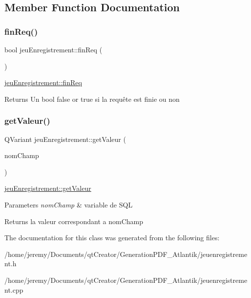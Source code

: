 \subsection{Member Function Documentation}
\mbox{\label{classjeu_enregistrement_ad4689ab49e4a51fde86e3b00e15e473e}} 
\subsubsection{\texorpdfstring{fin\+Req()}{finReq()}}
{\footnotesize\ttfamily bool jeu\+Enregistrement\+::fin\+Req (\begin{DoxyParamCaption}{ }\end{DoxyParamCaption})}



\hyperlink{classjeu_enregistrement_ad4689ab49e4a51fde86e3b00e15e473e}{jeu\+Enregistrement\+::fin\+Req} 

\begin{DoxyReturn}{Returns}
Un bool false or true si la requête est finie ou non 
\end{DoxyReturn}
\mbox{\label{classjeu_enregistrement_acd8e0e1bc08d6b1a5c5966d565e134a2}} 
\subsubsection{\texorpdfstring{get\+Valeur()}{getValeur()}}
{\footnotesize\ttfamily Q\+Variant jeu\+Enregistrement\+::get\+Valeur (\begin{DoxyParamCaption}\item[{Q\+String}]{nom\+Champ }\end{DoxyParamCaption})}



\hyperlink{classjeu_enregistrement_acd8e0e1bc08d6b1a5c5966d565e134a2}{jeu\+Enregistrement\+::get\+Valeur} 


\begin{DoxyParams}{Parameters}
{\em nom\+Champ} & variable de S\+QL \\
\hline
\end{DoxyParams}
\begin{DoxyReturn}{Returns}
la valeur correspondant a nom\+Champ 
\end{DoxyReturn}


The documentation for this class was generated from the following files\+:\begin{DoxyCompactItemize}
\item 
/home/jeremy/\+Documents/qt\+Creator/\+Generation\+P\+D\+F\+\_\+\+Atlantik/jeuenregistrement.\+h\item 
/home/jeremy/\+Documents/qt\+Creator/\+Generation\+P\+D\+F\+\_\+\+Atlantik/jeuenregistrement.\+cpp\end{DoxyCompactItemize}

